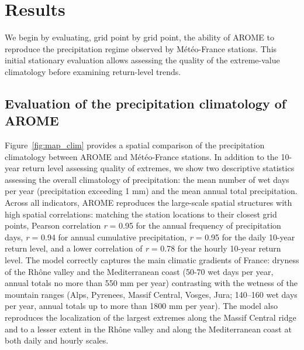 \documentclass[hess, manuscript]{copernicus}
\begin{document}
%

\section{Results}\label{results}

We begin by evaluating, grid point by grid point, the ability of AROME
to reproduce the precipitation regime observed by Météo-France stations.
This initial stationary evaluation allows assessing the quality of the extreme-value climatology before examining return-level trends.

\subsection{Evaluation of the precipitation climatology of AROME}
\label{evaluation-of-the-precipitation-climatology-by-arome}

Figure~\ref{fig:map_clim} provides a spatial comparison of the precipitation climatology between AROME and Météo-France stations. In addition to the 10-year return level assessing quality of extremes, we show two descriptive statistics assessing the overall climatology of precipitation: the mean number of wet days per year (precipitation exceeding 1 mm) and the mean annual total precipitation. Across all indicators, AROME reproduces the large-scale spatial structures with high spatial correlations: matching the station locations to their closest grid points, Pearson correlation \emph{r} = 0.95 for the annual frequency of precipitation days, \emph{r} = 0.94 for annual cumulative precipitation, \emph{r} = 0.95 for the daily 10-year return level, and a lower correlation of \emph{r} = 0.78 for the hourly 10-year return level. The model correctly captures the main climatic gradients of France: dryness of the Rhône valley and the Mediterranean coast (50-70 wet days per year, annual totals no more than 550 mm per year) contrasting with the wetness of the mountain ranges (Alps, Pyrenees, Massif Central, Vosges, Jura; 140--160 wet days per year, annual totals up to more than 1800 mm per year). The model also reproduces the localization of the largest extremes along the Massif Central ridge and to a lesser extent in the Rhône valley and along the Mediterranean coast at both daily and hourly scales.
\end{document}
